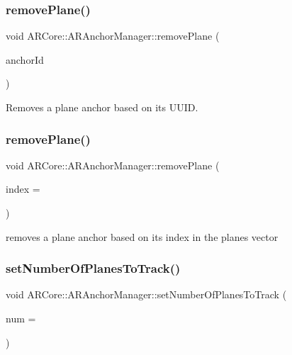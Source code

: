 \subsubsection{\texorpdfstring{remove\+Plane()}{removePlane()}\hspace{0.1cm}{\footnotesize\ttfamily [1/2]}}
{\footnotesize\ttfamily void A\+R\+Core\+::\+A\+R\+Anchor\+Manager\+::remove\+Plane (\begin{DoxyParamCaption}\item[{N\+S\+U\+U\+ID $\ast$}]{anchor\+Id }\end{DoxyParamCaption})}



Removes a plane anchor based on it\textquotesingle{}s U\+U\+ID. 

\mbox{\label{class_a_r_core_1_1_a_r_anchor_manager_a7d01736351089d31708ca4c577da99a4}} 
\subsubsection{\texorpdfstring{remove\+Plane()}{removePlane()}\hspace{0.1cm}{\footnotesize\ttfamily [2/2]}}
{\footnotesize\ttfamily void A\+R\+Core\+::\+A\+R\+Anchor\+Manager\+::remove\+Plane (\begin{DoxyParamCaption}\item[{int}]{index = {} }\end{DoxyParamCaption})}



removes a plane anchor based on it\textquotesingle{}s index in the planes vector 

\mbox{\label{class_a_r_core_1_1_a_r_anchor_manager_ab3ec0ff668e2adab3a0526ad79abd9f3}} 
\subsubsection{\texorpdfstring{set\+Number\+Of\+Planes\+To\+Track()}{setNumberOfPlanesToTrack()}}
{\footnotesize\ttfamily void A\+R\+Core\+::\+A\+R\+Anchor\+Manager\+::set\+Number\+Of\+Planes\+To\+Track (\begin{DoxyParamCaption}\item[{int}]{num = {} }\end{DoxyParamCaption})}



